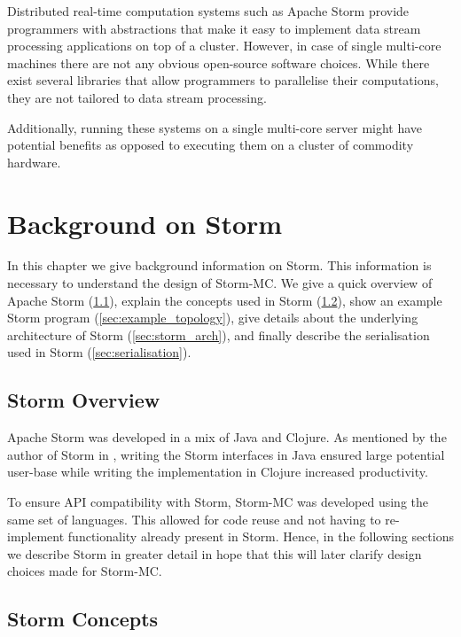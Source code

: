 \documentclass[bsc,deptreport,twoside,singlespacing,normalheadings,parskip]{infthesis}\usepackage[]{graphicx}\usepackage[]{color}
\begin{document}
Distributed real-time computation systems such as Apache Storm provide programmers with abstractions that make it easy to implement data stream processing applications on top of a cluster. However, in case of single multi-core machines there are not any obvious open-source software choices. While there exist several libraries that allow programmers to parallelise their computations, they are not tailored to data stream processing.

Additionally, running these systems on a single multi-core server might have potential benefits as opposed to executing them on a cluster of commodity hardware.

\clearpage{}

\clearpage{}\chapter{Background on Storm}

In this chapter we give background information on Storm. This information is necessary to understand the design of Storm-MC. We give a quick overview of Apache Storm (\ref{sec:storm_overview}), explain the concepts used in Storm (\ref{sec:concepts}), show an example Storm program (\ref{sec:example_topology}), give details about the underlying architecture of Storm (\ref{sec:storm_arch}), and finally describe the serialisation used in Storm (\ref{sec:serialisation}).

\section{Storm Overview}
\label{sec:storm_overview}

Apache Storm was developed in a mix of Java and Clojure. As mentioned by the author of Storm in \cite{Marz_2014}, writing the Storm interfaces in Java ensured large potential user-base while writing the implementation in Clojure increased productivity.

To ensure API compatibility with Storm, Storm-MC was developed using the same set of languages. This allowed for code reuse and not having to re-implement functionality already present in Storm. Hence, in the following sections we describe Storm in greater detail in hope that this will later clarify design choices made for Storm-MC.

\section{Storm Concepts}
\label{sec:concepts}
\end{document}

